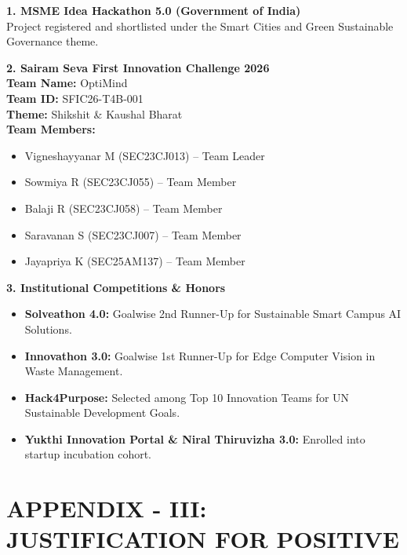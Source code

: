 \documentclass[12pt,a4paper]{report}
\begin{document}
\noindent
\textbf{1. MSME Idea Hackathon 5.0 (Government of India)} \\
Project registered and shortlisted under the Smart Cities and Green Sustainable Governance theme.

\vspace{0.4cm}
\noindent
\textbf{2. Sairam Seva First Innovation Challenge 2026} \\
\textbf{Team Name:} OptiMind \\
\textbf{Team ID:} SFIC26-T4B-001 \\
\textbf{Theme:} Shikshit \& Kaushal Bharat \\
\textbf{Team Members:}
\begin{itemize}
\item Vigneshayyanar M (SEC23CJ013) -- Team Leader
\item Sowmiya R (SEC23CJ055) -- Team Member
\item Balaji R (SEC23CJ058) -- Team Member
\item Saravanan S (SEC23CJ007) -- Team Member
\item Jayapriya K (SEC25AM137) -- Team Member
\end{itemize}

\vspace{0.4cm}
\noindent
\textbf{3. Institutional Competitions \& Honors}
\begin{itemize}
\item \textbf{Solveathon 4.0:} Goalwise 2nd Runner-Up for Sustainable Smart Campus AI Solutions.
\item \textbf{Innovathon 3.0:} Goalwise 1st Runner-Up for Edge Computer Vision in Waste Management.
\item \textbf{Hack4Purpose:} Selected among Top 10 Innovation Teams for UN Sustainable Development Goals.
\item \textbf{Yukthi Innovation Portal \& Niral Thiruvizha 3.0:} Enrolled into startup incubation cohort.
\end{itemize}

\newpage
\chapter*{APPENDIX - III: JUSTIFICATION FOR POSITIVE}
\end{document}
